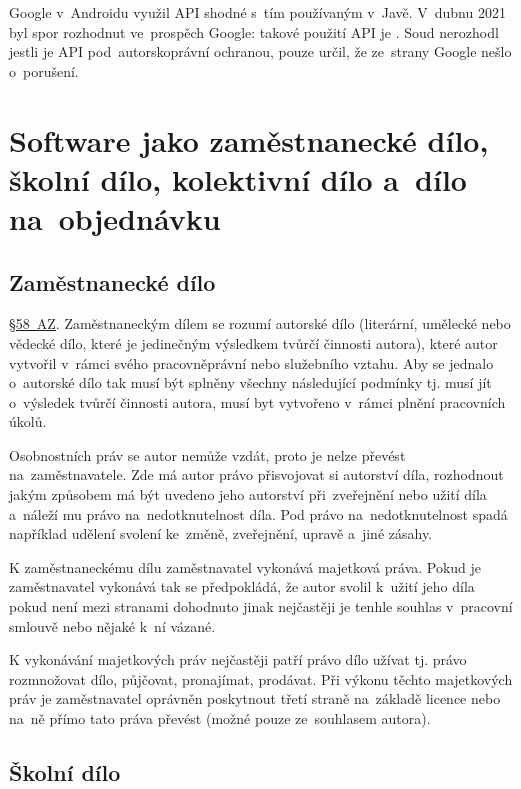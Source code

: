 Google v~Androidu využil API shodné s~tím používaným v~Javě. V~dubnu 2021 byl spor rozhodnut ve~prospěch Google: takové použití API je . Soud nerozhodl jestli je API pod~autorskoprávní ochranou, pouze určil, že ze~strany Google nešlo o~porušení.

\clearpage
\section{Software jako zaměstnanecké dílo, školní dílo, kolektivní dílo a~dílo na~objednávku}

\subsection{Zaměstnanecké dílo}

\href{https://www.zakonyprolidi.cz/cs/2000-121#p58}{§58~AZ}. Zaměstnaneckým dílem se rozumí autorské dílo (literární, umělecké nebo vědecké dílo, které je jedinečným výsledkem tvůrčí činnosti autora), které autor vytvořil v~rámci svého pracovněprávní nebo služebního vztahu. Aby se jednalo o~autorské dílo tak musí být splněny všechny následující podmínky tj. musí jít o~výsledek tvůrčí činnosti autora, musí byt vytvořeno v~rámci plnění pracovních úkolů.

Osobnostních práv se autor nemůže vzdát, proto je nelze převést na~zaměstnavatele. Zde má autor právo přisvojovat si autorství díla, rozhodnout jakým způsobem má být uvedeno jeho autorství při~zveřejnění nebo užití díla a~náleží mu právo na~nedotknutelnost díla. Pod právo na~nedotknutelnost spadá například udělení svolení ke~změně, zveřejnění, upravě a~jiné zásahy.

K zaměstnaneckému dílu zaměstnavatel vykonává majetková práva. Pokud je zaměstnavatel vykonává tak se předpokládá, že autor svolil k~užití jeho díla pokud není mezi stranami dohodnuto jinak nejčastěji je tenhle souhlas v~pracovní smlouvě nebo nějaké k~ní vázané.

K vykonávání majetkových práv nejčastěji patří právo dílo užívat tj. právo rozmnožovat dílo, půjčovat, pronajímat, prodávat. Při výkonu těchto majetkových práv je zaměstnavatel oprávněn poskytnout třetí straně na~základě licence nebo na~ně přímo tato práva převést (možné pouze ze~souhlasem autora).

\subsection{Školní dílo}

